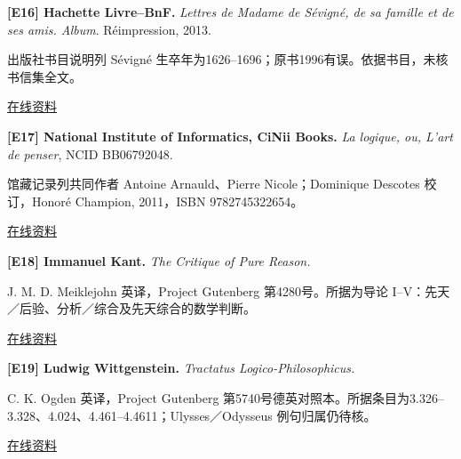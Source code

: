 \par\noindent\begin{minipage}{\linewidth}
\label{ref-16}\noindent\textbf{[E16] Hachette Livre--BnF.} \textit{Lettres de Madame de Sévigné, de sa famille et de ses amis. Album}. Réimpression, 2013.\par\nobreak
出版社书目说明列 Sévigné 生卒年为1626–1696；原书1996有误。依据书目，未核书信集全文。\par
{\small\href{https://books.google.tt/books?id=9YLuoQEACAAJ}{在线资料}}\par
\par\end{minipage}\par

\par\noindent\begin{minipage}{\linewidth}
\label{ref-17}\noindent\textbf{[E17] National Institute of Informatics, CiNii Books.} \textit{La logique, ou, L’art de penser}, NCID BB06792048.\par\nobreak
馆藏记录列共同作者 Antoine Arnauld、Pierre Nicole；Dominique Descotes 校订，Honoré Champion, 2011，ISBN 9782745322654。\par
{\small\href{https://ci.nii.ac.jp/ncid/BB06792048}{在线资料}}\par
\par\end{minipage}\par

\par\noindent\begin{minipage}{\linewidth}
\label{ref-18}\noindent\textbf{[E18] Immanuel Kant.} \textit{The Critique of Pure Reason.}\par\nobreak
J. M. D. Meiklejohn 英译，Project Gutenberg 第4280号。所据为导论 I–V：先天／后验、分析／综合及先天综合的数学判断。\par
{\small\href{https://www.gutenberg.org/files/4280/4280-h/4280-h.htm}{在线资料}}\par
\par\end{minipage}\par

\par\noindent\begin{minipage}{\linewidth}
\label{ref-19}\noindent\textbf{[E19] Ludwig Wittgenstein.} \textit{Tractatus Logico-Philosophicus.}\par\nobreak
C. K. Ogden 英译，Project Gutenberg 第5740号德英对照本。所据条目为3.326–3.328、4.024、4.461–4.4611；Ulysses／Odysseus 例句归属仍待核。\par
{\small\href{https://www.gutenberg.org/files/5740/5740-pdf.pdf}{在线资料}}\par
\par\end{minipage}\par

